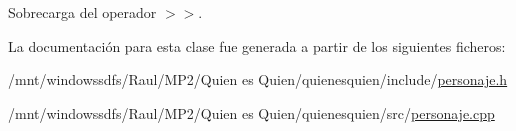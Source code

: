 Sobrecarga del operador $>$$>$. 



La documentación para esta clase fue generada a partir de los siguientes ficheros:\begin{CompactItemize}
\item 
/mnt/windowssdfs/Raul/MP2/Quien es Quien/quienesquien/include/\hyperlink{personaje_8h}{personaje.h}\item 
/mnt/windowssdfs/Raul/MP2/Quien es Quien/quienesquien/src/\hyperlink{personaje_8cpp}{personaje.cpp}\end{CompactItemize}
